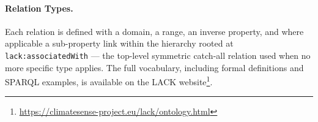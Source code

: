 \paragraph{Relation Types.}
Each relation is defined with a domain, a range, an inverse property, and where applicable a sub-property link within the hierarchy rooted at \texttt{lack:associatedWith} --- the top-level symmetric catch-all relation used when no more specific type applies.
The full vocabulary, including formal definitions and SPARQL examples, is available on the LACK website\footnote{\url{https://climatesense-project.eu/lack/ontology.html}}.

